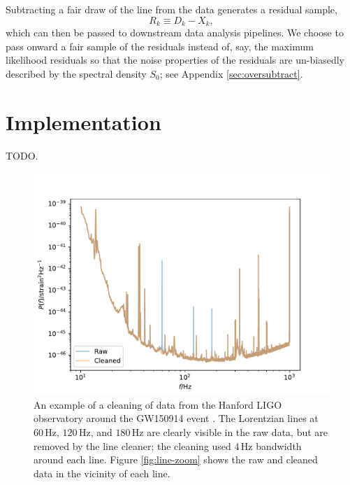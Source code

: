 \documentclass[modern]{aastex631}
\begin{document}
Subtracting a fair draw of the line from the data generates a residual sample, 
\begin{equation}
    R_k \equiv D_k - X_k,
\end{equation}
which can then be passed to downstream data analysis pipelines.  We choose to
pass onward a fair sample of the residuals instead of, say, the maximum
likelihood residuals so that the noise properties of the residuals are
un-biasedly described by the spectral density $S_0$; see Appendix
\ref{sec:oversubtract}.

\section{Implementation}

TODO.

\begin{figure}
    \includegraphics[width=\columnwidth]{raw-and-cleaned-psd.pdf}
    \caption{\label{fig:cleaned-psd} An example of a cleaning of data from the Hanford LIGO observatory around the GW150914 event \cite{Abbott2016,Abbott2019,GWOSC,GWOSC2,GW150914-GWOSC}.  The Lorentzian lines at $60 \, \mathrm{Hz}$, $120 \, \mathrm{Hz}$, and $180 \, \mathrm{Hz}$ are clearly visible in the raw data, but are removed by the line cleaner; the cleaning used $4 \, \mathrm{Hz}$ bandwidth around each line.  Figure \ref{fig:line-zoom} shows the raw and cleaned data in the vicinity of each line.}
\end{figure}
\end{document}
